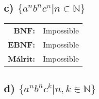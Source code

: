 \documentclass[leqno]{article}
\begin{document}
	\subsection{c) $\{a^nb^nc^n|n \in \mathbb{N}\}$}

		\begin{center}\begin{tabular}{rl}
				\textbf{BNF:} &
				Impossible \\[5ex]

				\textbf{EBNF:} &
				Impossible \\[5ex]

				\textbf{Málrit:} &
				Impossible \\[5ex]
			\end{tabular}
		\end{center}

		\subsection{d) $\{a^nb^nc^k|n,k \in \mathbb{N}\}$}
\end{document}
